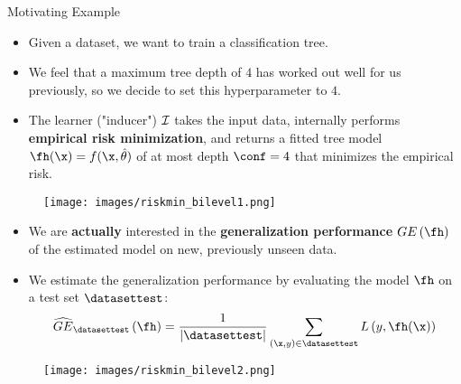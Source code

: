 
\subtitle{Overview and Introduction}



\maketitle



\begin{frame}{Motivating Example}

\begin{itemize}
\item Given a dataset, we want to train a classification tree.
\item We feel that a maximum tree depth of $4$ has worked out well for us previously, so we decide to set this hyperparameter to $4$.
\item The learner ("inducer") $\mathcal{I}$ takes the input data, internally performs \textbf{empirical risk minimization}, and returns a fitted tree model $\fh(\x) = f(\x, \hat{\theta})$ of at most depth $\conf = 4$ that minimizes the empirical risk.
\end{itemize}

\begin{center}
\begin{figure}
\texttt{[image: images/riskmin\_bilevel1.png]}
\end{figure}
\end{center}

\framebreak

\begin{itemize}
\item We are \textbf{actually} interested in the \textbf{generalization performance} $GE\left(\fh\right)$ of the estimated model on new, previously unseen data.
\item We estimate the generalization performance by evaluating the model $\fh$ on a test set $\datasettest$: $$
\widehat{GE}_{\datasettest}\left(\fh\right) = \frac{1}{|\datasettest|} \sum\limits_{(\x, y) \in \datasettest} L\left(y, \fh(\x) \right)
$$
\end{itemize}
\vspace*{-0.6cm}
\begin{center}
\begin{figure}
\texttt{[image: images/riskmin\_bilevel2.png]}
\end{figure}
\end{center}


\end{frame}
